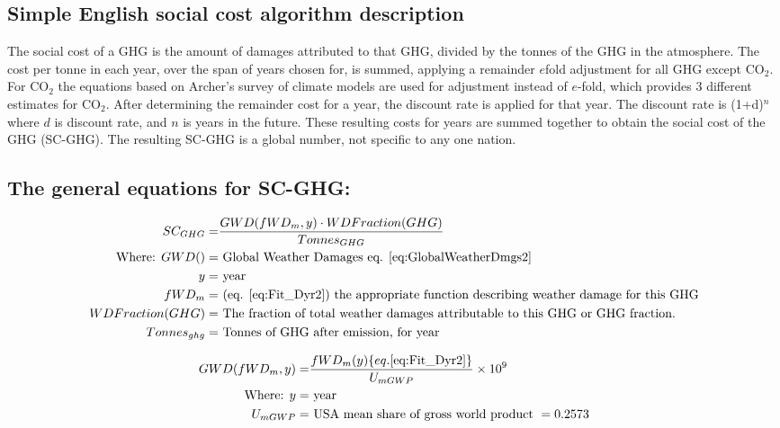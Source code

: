 \documentclass{article}
\begin{document}
\subsection{Simple English social cost algorithm description}
The social cost of a GHG is the amount of damages attributed to that GHG, divided by the tonnes of the GHG in the atmosphere. The cost per tonne in each year, over the span of years chosen for, is summed, applying a remainder $e$fold adjustment for all GHG except CO$_2$. For CO$_2$ the equations based on Archer's survey of climate models are used for adjustment instead of $e$-fold, which provides 3 different estimates for CO$_2$. After determining the remainder cost for a year, the discount rate is applied for that year. The discount rate is (1+d)$^n$ where $d$ is discount rate, and $n$ is years in the future. These resulting costs for years are summed together to obtain the social cost of the GHG (SC-GHG). The resulting SC-GHG is a global number, not specific to any one nation. 

\subsection{The general equations for SC-GHG:} 

\begin{align}\label{eq:GeneralSC-GHG}
\begin{split}
 SC_{GHG} =& \frac{GWD(fWD_m, y)  \cdot WDFraction(GHG) } {Tonnes
 _{GHG}} \\
\text{Where: } GWD()=& \text{ Global Weather Damages eq. \ref{eq:GlobalWeatherDmgs2}} \\ 
  y =& \text{ year } \\
 fWD_m  =& \text{ (eq. \ref{eq:Fit_Dyr2})  the appropriate function describing weather damage for this GHG}  \\
 WDFraction(GHG)=& \text{ The fraction of total weather damages attributable to this GHG or GHG fraction.} \\
 Tonnes_{ghg}=& \text{ Tonnes of GHG after emission, for year}
\end{split}
\end{align} 

\begin{align}\label{eq:GlobalWeatherDmgs1}
\begin{split}
 GWD(fWD_m, y) =& \frac{fWD_m(y)  \{eq. \ref{eq:Fit_Dyr2} \} } {U_{mGWP}} \times 10^9 \\
\text{Where: } y =& \text{ year } \\
 U_{mGWP}  =& \text{ USA  mean  share  of  gross  world  product } = 0.2573  \\
\end{split}
\end{align} 
\end{document}
